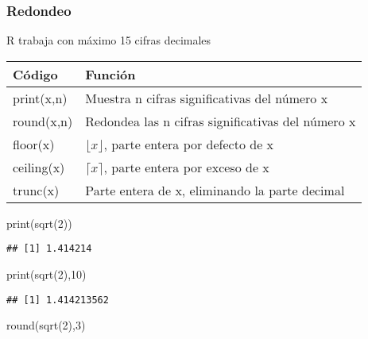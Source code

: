 \documentclass[
]{article}
\newenvironment{Shaded}{\begin{snugshade}}{\end{snugshade}}
\newcommand{\DecValTok}[1]{\textcolor[rgb]{0.00,0.00,0.81}{#1}}
\newcommand{\FunctionTok}[1]{\textcolor[rgb]{0.00,0.00,0.00}{#1}}
\newcommand{\NormalTok}[1]{#1}
\begin{document}
\hypertarget{redondeo}{%
\subsubsection{Redondeo}\label{redondeo}}

R trabaja con máximo 15 cifras decimales

\begin{longtable}[]{@{}ll@{}}
\toprule()
Código & Función \\
\midrule()
\endhead
print(x,n) & Muestra n cifras significativas del número x \\
round(x,n) & Redondea las n cifras significativas del número x \\
floor(x) & \(\lfloor x \rfloor\), parte entera por defecto de x \\
ceiling(x) & \(\lceil x \rceil\), parte entera por exceso de x \\
trunc(x) & Parte entera de x, eliminando la parte decimal \\
\bottomrule()
\end{longtable}

\begin{Shaded}
\begin{Highlighting}[]
\FunctionTok{print}\NormalTok{(}\FunctionTok{sqrt}\NormalTok{(}\DecValTok{2}\NormalTok{))}
\end{Highlighting}
\end{Shaded}

\begin{verbatim}
## [1] 1.414214
\end{verbatim}

\begin{Shaded}
\begin{Highlighting}[]
\FunctionTok{print}\NormalTok{(}\FunctionTok{sqrt}\NormalTok{(}\DecValTok{2}\NormalTok{),}\DecValTok{10}\NormalTok{)}
\end{Highlighting}
\end{Shaded}

\begin{verbatim}
## [1] 1.414213562
\end{verbatim}

\begin{Shaded}
\begin{Highlighting}[]
\FunctionTok{round}\NormalTok{(}\FunctionTok{sqrt}\NormalTok{(}\DecValTok{2}\NormalTok{),}\DecValTok{3}\NormalTok{)}
\end{Highlighting}
\end{Shaded}
\end{document}
